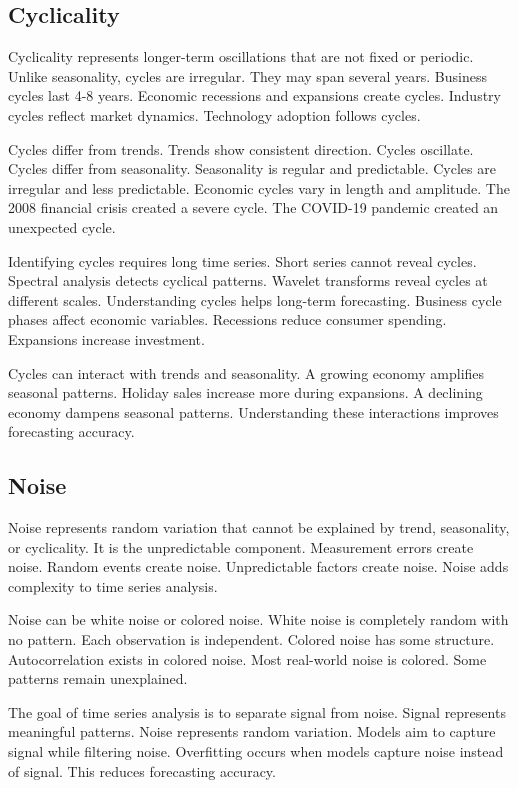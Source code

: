 \subsection{Cyclicality}

Cyclicality represents longer-term oscillations that are not fixed or periodic. Unlike seasonality, cycles are irregular. They may span several years. Business cycles last 4-8 years. Economic recessions and expansions create cycles. Industry cycles reflect market dynamics. Technology adoption follows cycles.

Cycles differ from trends. Trends show consistent direction. Cycles oscillate. Cycles differ from seasonality. Seasonality is regular and predictable. Cycles are irregular and less predictable. Economic cycles vary in length and amplitude. The 2008 financial crisis created a severe cycle. The COVID-19 pandemic created an unexpected cycle.

Identifying cycles requires long time series. Short series cannot reveal cycles. Spectral analysis detects cyclical patterns. Wavelet transforms reveal cycles at different scales. Understanding cycles helps long-term forecasting. Business cycle phases affect economic variables. Recessions reduce consumer spending. Expansions increase investment.

Cycles can interact with trends and seasonality. A growing economy amplifies seasonal patterns. Holiday sales increase more during expansions. A declining economy dampens seasonal patterns. Understanding these interactions improves forecasting accuracy.

\subsection{Noise}

Noise represents random variation that cannot be explained by trend, seasonality, or cyclicality. It is the unpredictable component. Measurement errors create noise. Random events create noise. Unpredictable factors create noise. Noise adds complexity to time series analysis.

Noise can be white noise or colored noise. White noise is completely random with no pattern. Each observation is independent. Colored noise has some structure. Autocorrelation exists in colored noise. Most real-world noise is colored. Some patterns remain unexplained.

The goal of time series analysis is to separate signal from noise. Signal represents meaningful patterns. Noise represents random variation. Models aim to capture signal while filtering noise. Overfitting occurs when models capture noise instead of signal. This reduces forecasting accuracy.

